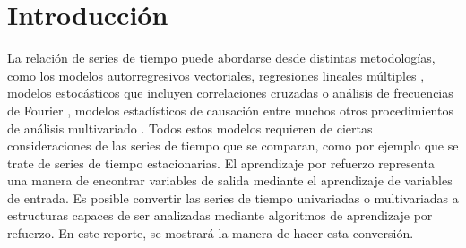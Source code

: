 \section{Introducción}

La relación de series de tiempo puede abordarse desde distintas metodologías, como los modelos autorregresivos vectoriales, regresiones lineales múltiples \cite{Wei2019}, modelos estocásticos que incluyen correlaciones cruzadas o análisis de frecuencias de Fourier \cite{Pandit2001}, modelos estadísticos de causación \cite{Eichler2013} entre muchos otros procedimientos de análisis multivariado \cite{Wei2019a}. Todos estos modelos requieren de ciertas consideraciones de las series de tiempo que se comparan, como por ejemplo que se trate de series de tiempo estacionarias. El aprendizaje por refuerzo representa una manera de encontrar variables de salida mediante el aprendizaje de variables de entrada. Es posible convertir las series de tiempo univariadas o multivariadas a estructuras capaces de ser analizadas mediante algoritmos de aprendizaje por refuerzo. En este reporte, se mostrará la manera de hacer esta conversión. 